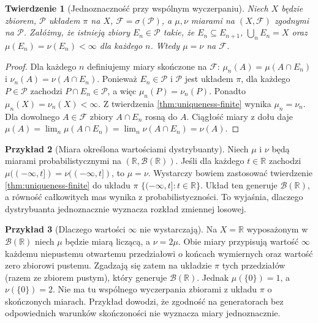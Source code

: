 \documentclass[11pt,a4paper,oneside]{book}
\numberwithin{equation}{chapter}
\theoremstyle{plain}
\newtheorem{twierdzenie}{Twierdzenie}[chapter]
\theoremstyle{definition}
\newtheorem{przyklad}[twierdzenie]{Przykład}
\theoremstyle{remark}
\begin{document}
\begin{twierdzenie}[Jednoznaczność przy wspólnym wyczerpaniu]
\label{thm:uniqueness-sigma-finite}
Niech $X$ będzie zbiorem, $\mathcal P$ układem $\pi$ na $X$,
$\mathcal F=\sigma(\mathcal P)$, a $\mu,\nu$ miarami
na $(X,\mathcal F)$ zgodnymi na $\mathcal P$.
Załóżmy, że istnieją zbiory $E_n\in\mathcal P$ takie, że
$E_n\subseteq E_{n+1}$, $\bigcup_nE_n=X$ oraz
$\mu(E_n)=\nu(E_n)<\infty$ dla każdego $n$.
Wtedy $\mu=\nu$ na $\mathcal F$.
\end{twierdzenie}
\begin{proof}
Dla każdego $n$ definiujemy miary skończone na $\mathcal F$:
$\mu_n(A)=\mu(A\cap E_n)$ i
$\nu_n(A)=\nu(A\cap E_n)$.
Ponieważ $E_n\in\mathcal P$ i $\mathcal P$ jest układem $\pi$,
dla każdego $P\in\mathcal P$ zachodzi
$P\cap E_n\in\mathcal P$, a więc
$\mu_n(P)=\nu_n(P)$. Ponadto
$\mu_n(X)=\nu_n(X)<\infty$. Z twierdzenia
\ref{thm:uniqueness-finite} wynika $\mu_n=\nu_n$.
Dla dowolnego $A\in\mathcal F$ zbiory
$A\cap E_n$ rosną do $A$. Ciągłość miary z dołu
daje
$\mu(A)=\lim_n\mu(A\cap E_n)
=\lim_n\nu(A\cap E_n)=\nu(A)$.
\end{proof}

\begin{przyklad}[Miara określona wartościami dystrybuanty]
\label{ex:unique-cdf}
Niech $\mu$ i $\nu$ będą miarami probabilistycznymi
na $(\mathbb R,\mathcal B(\mathbb R))$.
Jeśli dla każdego $t\in\mathbb R$ zachodzi
$\mu((-\infty,t])=\nu((-\infty,t])$, to $\mu=\nu$.
Wystarczy bowiem zastosować twierdzenie
\ref{thm:uniqueness-finite} do układu $\pi$
$\{(-\infty,t]:t\in\mathbb R\}$.
Układ ten generuje $\mathcal B(\mathbb R)$,
a równość całkowitych mas wynika z probabilistyczności.
To wyjaśnia, dlaczego dystrybuanta jednoznacznie
wyznacza rozkład zmiennej losowej.
\end{przyklad}

\begin{przyklad}[Dlaczego wartości $\infty$ nie wystarczają]
\label{ex:uniqueness-fails}
Na $X=\mathbb R$ wyposażonym w $\mathcal B(\mathbb R)$
niech $\mu$ będzie miarą liczącą, a $\nu=2\mu$.
Obie miary przypisują wartość $\infty$ każdemu niepustemu
otwartemu przedziałowi o końcach wymiernych oraz wartość
zero zbiorowi pustemu. Zgadzają się zatem na układzie
$\pi$ tych przedziałów (razem ze zbiorem pustym),
który generuje $\mathcal B(\mathbb R)$.
Jednak $\mu(\{0\})=1$, a $\nu(\{0\})=2$.
Nie ma tu wspólnego wyczerpania zbiorami z układu $\pi$
o skończonych miarach. Przykład dowodzi, że zgodność
na generatorach bez odpowiednich warunków skończoności
nie wyznacza miary jednoznacznie.
\end{przyklad}
\end{document}
